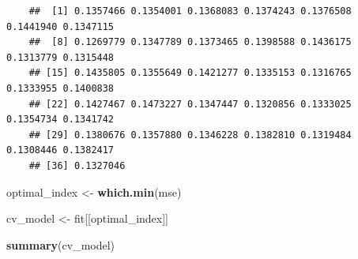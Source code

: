 \documentclass[11pt, a4paper]{report}
\newenvironment{Shaded}{\begin{snugshade}}{\end{snugshade}}
\newcommand{\DataTypeTok}[1]{\textcolor[rgb]{0.13,0.29,0.53}{#1}}
\newcommand{\DecValTok}[1]{\textcolor[rgb]{0.00,0.00,0.81}{#1}}
\newcommand{\KeywordTok}[1]{\textcolor[rgb]{0.13,0.29,0.53}{\textbf{#1}}}
\newcommand{\NormalTok}[1]{#1}
\newcommand{\OperatorTok}[1]{\textcolor[rgb]{0.81,0.36,0.00}{\textbf{#1}}}
\newcommand{\OtherTok}[1]{\textcolor[rgb]{0.56,0.35,0.01}{#1}}
\newcommand{\StringTok}[1]{\textcolor[rgb]{0.31,0.60,0.02}{#1}}
\theoremstyle{plain}
\theoremstyle{plain}
\theoremstyle{remark}
\begin{document}
\begin{Shaded}
\end{Shaded}

\begin{verbatim}
	##  [1] 0.1357466 0.1354001 0.1368083 0.1374243 0.1376508 0.1441940 0.1347115
	##  [8] 0.1269779 0.1347789 0.1373465 0.1398588 0.1436175 0.1313779 0.1315448
	## [15] 0.1435805 0.1355649 0.1421277 0.1335153 0.1316765 0.1333955 0.1400838
	## [22] 0.1427467 0.1473227 0.1347447 0.1320856 0.1333025 0.1354734 0.1341742
	## [29] 0.1380676 0.1357880 0.1346228 0.1382810 0.1319484 0.1308446 0.1382417
	## [36] 0.1327046
\end{verbatim}

\begin{Shaded}
	\begin{Highlighting}[]
		\NormalTok{optimal_index <-}\StringTok{ }\KeywordTok{which.min}\NormalTok{(mse)}
		
		\NormalTok{cv_model <-}\StringTok{ }\NormalTok{fit[[optimal_index]]}
		
		\KeywordTok{summary}\NormalTok{(cv_model)}
	\end{Highlighting}
\end{Shaded}
\end{document}
